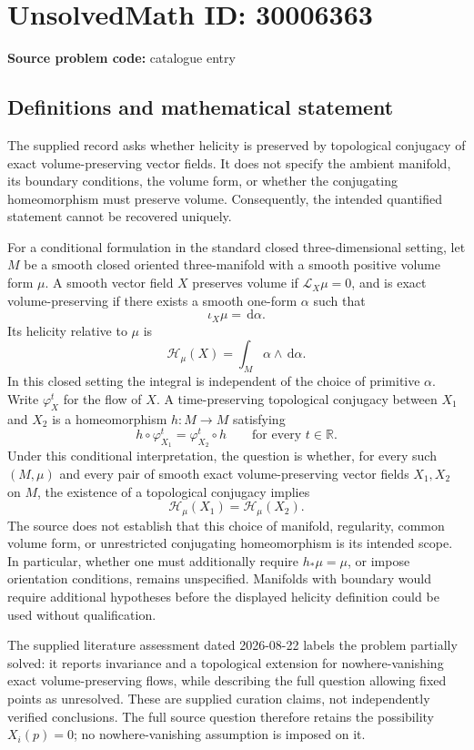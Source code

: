 \documentclass[11pt]{article}
\newcommand{\R}{\mathbb{R}}
\newcommand{\dd}{\,\mathrm{d}}
\begin{document}
\section*{UnsolvedMath ID: 30006363}
\textbf{Source problem code:} catalogue entry
\subsection{Definitions and mathematical statement}
The supplied record asks whether helicity is preserved by topological conjugacy of exact volume-preserving vector fields. It does not specify the ambient manifold, its boundary conditions, the volume form, or whether the conjugating homeomorphism must preserve volume. Consequently, the intended quantified statement cannot be recovered uniquely.

For a conditional formulation in the standard closed three-dimensional setting, let \(M\) be a smooth closed oriented three-manifold with a smooth positive volume form \(\mu\). A smooth vector field \(X\) preserves volume if \(\mathcal L_X\mu=0\), and is exact volume-preserving if there exists a smooth one-form \(\alpha\) such that
\[
\iota_X\mu=\dd\alpha.
\]
Its helicity relative to \(\mu\) is
\[
\mathcal H_\mu(X)=\int_M\alpha\wedge\dd\alpha.
\]
In this closed setting the integral is independent of the choice of primitive \(\alpha\). Write \(\varphi_X^t\) for the flow of \(X\). A time-preserving topological conjugacy between \(X_1\) and \(X_2\) is a homeomorphism \(h:M\to M\) satisfying
\[
 h\circ\varphi_{X_1}^t=\varphi_{X_2}^t\circ h
 \qquad\text{for every }t\in\R.
\]
Under this conditional interpretation, the question is whether, for every such \((M,\mu)\) and every pair of smooth exact volume-preserving vector fields \(X_1,X_2\) on \(M\), the existence of a topological conjugacy implies
\[
\mathcal H_\mu(X_1)=\mathcal H_\mu(X_2).
\]
The source does not establish that this choice of manifold, regularity, common volume form, or unrestricted conjugating homeomorphism is its intended scope. In particular, whether one must additionally require \(h_*\mu=\mu\), or impose orientation conditions, remains unspecified. Manifolds with boundary would require additional hypotheses before the displayed helicity definition could be used without qualification.

The supplied literature assessment dated 2026-08-22 labels the problem partially solved: it reports invariance and a topological extension for nowhere-vanishing exact volume-preserving flows, while describing the full question allowing fixed points as unresolved. These are supplied curation claims, not independently verified conclusions. The full source question therefore retains the possibility \(X_i(p)=0\); no nowhere-vanishing assumption is imposed on it.
\end{document}
